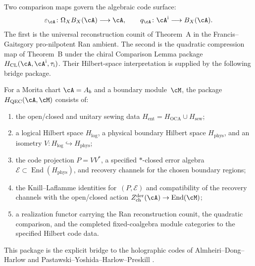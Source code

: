 Two comparison maps govern the algebraic code surface:
\[
 \varepsilon_\cA\colon\Omega_XB_X(\cA)\longrightarrow\cA,
 \qquad
 q_\cA\colon\cA^{\mathrm i}\longrightarrow B_X(\cA).
\]
The first is the universal reconstruction counit of Theorem~A in the
Francis--Gaitsgory pro-nilpotent Ran ambient.
The second is the quadratic compression map of Theorem~B under the
chiral Comparison Lemma package
$H_{\mathrm{CL}}(\cA,\cA^{\mathrm i},\tau_{\mathrm i})$.
Their Hilbert-space interpretation is supplied by the following
bridge package.

\begin{definition}
\label{def:thqg-qec-bridge-package}
For a Morita chart $\cA=A_b$ and a boundary module~$\cM$, the package
$H_{\mathrm{QEC}}(\cA,\cM)$ consists of:
\begin{enumerate}[label=\textup{(Q\arabic*)}]
\item the open/closed and unitary sewing data
 $H_{\mathrm{ent}}=H_{\mathrm{OCA}}\cup H_{\mathrm{sew}}$;
\item a logical Hilbert space $H_{\mathrm{log}}$, a physical boundary
 Hilbert space $H_{\mathrm{phys}}$, and an isometry
 $V\colon H_{\mathrm{log}}\hookrightarrow H_{\mathrm{phys}}$;
\item the code projection $P=VV^*$, a specified $*$-closed error
 algebra $\mathcal E\subset\operatorname{End}(H_{\mathrm{phys}})$,
 and recovery channels for the chosen boundary regions;
\item the Knill--Laflamme identities for~$(P,\mathcal E)$ and
 compatibility of the recovery channels with the open/closed action
 $Z^{\mathrm{der}}_{\mathrm{ch}}(\cA)\to\operatorname{End}(\cM)$;
\item a realization functor carrying the Ran reconstruction counit,
 the quadratic comparison, and the completed fixed-coalgebra module
 categories to the specified Hilbert code data.
\end{enumerate}
This package is the explicit bridge to the holographic codes of
Almheiri--Dong--Harlow and
Pastawski--Yoshida--Harlow--Preskill
\cite{Almheiri-Dong-Harlow15,Pastawski-Yoshida-Harlow-Preskill15}.
\end{definition}

